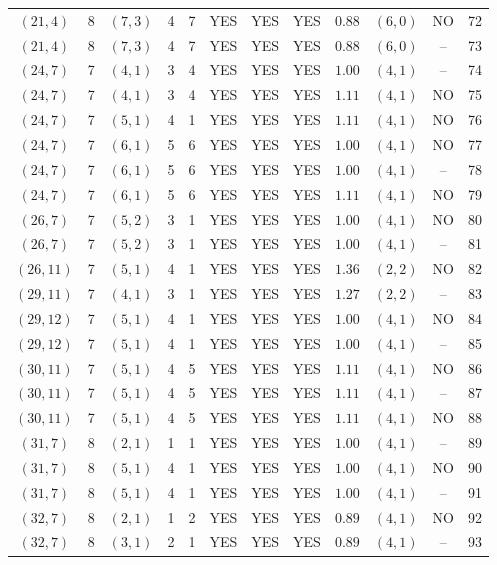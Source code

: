 \begin{longtable}{|c|c|c|c|c|c|c|c|c|c|c|c|}
$(21,4)$ & 8 & $(7,3)$ & 4 & 7 & YES & YES & YES & $0.88$ & $(6,0)$ & NO & 72\\
$(21,4)$ & 8 & $(7,3)$ & 4 & 7 & YES & YES & YES & $0.88$ & $(6,0)$ & -- & 73\\
$(24,7)$ & 7 & $(4,1)$ & 3 & 4 & YES & YES & YES & $1.00$ & $(4,1)$ & -- & 74\\
$(24,7)$ & 7 & $(4,1)$ & 3 & 4 & YES & YES & YES & $1.11$ & $(4,1)$ & NO & 75\\
$(24,7)$ & 7 & $(5,1)$ & 4 & 1 & YES & YES & YES & $1.11$ & $(4,1)$ & NO & 76\\
$(24,7)$ & 7 & $(6,1)$ & 5 & 6 & YES & YES & YES & $1.00$ & $(4,1)$ & NO & 77\\
$(24,7)$ & 7 & $(6,1)$ & 5 & 6 & YES & YES & YES & $1.00$ & $(4,1)$ & -- & 78\\
$(24,7)$ & 7 & $(6,1)$ & 5 & 6 & YES & YES & YES & $1.11$ & $(4,1)$ & NO & 79\\
$(26,7)$ & 7 & $(5,2)$ & 3 & 1 & YES & YES & YES & $1.00$ & $(4,1)$ & NO & 80\\
$(26,7)$ & 7 & $(5,2)$ & 3 & 1 & YES & YES & YES & $1.00$ & $(4,1)$ & -- & 81\\
$(26,11)$ & 7 & $(5,1)$ & 4 & 1 & YES & YES & YES & $1.36$ & $(2,2)$ & NO & 82\\
$(29,11)$ & 7 & $(4,1)$ & 3 & 1 & YES & YES & YES & $1.27$ & $(2,2)$ & -- & 83\\
$(29,12)$ & 7 & $(5,1)$ & 4 & 1 & YES & YES & YES & $1.00$ & $(4,1)$ & NO & 84\\
$(29,12)$ & 7 & $(5,1)$ & 4 & 1 & YES & YES & YES & $1.00$ & $(4,1)$ & -- & 85\\
$(30,11)$ & 7 & $(5,1)$ & 4 & 5 & YES & YES & YES & $1.11$ & $(4,1)$ & NO & 86\\
$(30,11)$ & 7 & $(5,1)$ & 4 & 5 & YES & YES & YES & $1.11$ & $(4,1)$ & -- & 87\\
$(30,11)$ & 7 & $(5,1)$ & 4 & 5 & YES & YES & YES & $1.11$ & $(4,1)$ & NO & 88\\
$(31,7)$ & 8 & $(2,1)$ & 1 & 1 & YES & YES & YES & $1.00$ & $(4,1)$ & -- & 89\\
$(31,7)$ & 8 & $(5,1)$ & 4 & 1 & YES & YES & YES & $1.00$ & $(4,1)$ & NO & 90\\
$(31,7)$ & 8 & $(5,1)$ & 4 & 1 & YES & YES & YES & $1.00$ & $(4,1)$ & -- & 91\\
$(32,7)$ & 8 & $(2,1)$ & 1 & 2 & YES & YES & YES & $0.89$ & $(4,1)$ & NO & 92\\
$(32,7)$ & 8 & $(3,1)$ & 2 & 1 & YES & YES & YES & $0.89$ & $(4,1)$ & -- & 93\\

\end{longtable}

